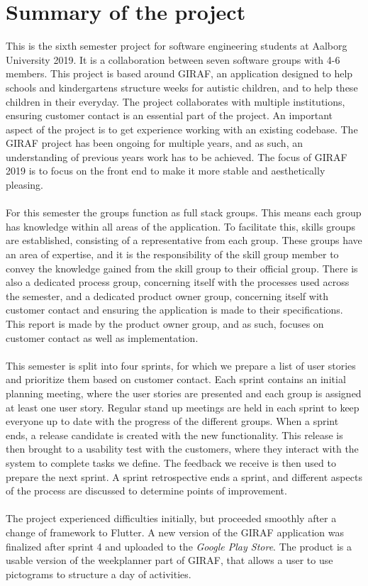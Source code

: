 \section{Summary of the project}\label{appendix:project-summary}
This is the sixth semester project for software engineering students at Aalborg University 2019.
It is a collaboration between seven software groups with 4-6 members.
This project is based around GIRAF, an application designed to help schools and kindergartens structure weeks for autistic children, and to help these children in their everyday.
The project collaborates with multiple institutions, ensuring customer contact is an essential part of the project.
An important aspect of the project is to get experience working with an existing codebase. 
The GIRAF project has been ongoing for multiple years, and as such, an understanding of previous years work has to be achieved.
The focus of GIRAF 2019 is to focus on the front end to make it more stable and aesthetically pleasing.
\\\\
For this semester the groups function as full stack groups.
This means each group has knowledge within all areas of the application.
To facilitate this, skills groups are established, consisting of a representative from each group.
These groups have an area of expertise, and it is the responsibility of the skill group member to convey the knowledge gained from the skill group to their official group.
There is also a dedicated process group, concerning itself with the processes used across the semester, and a dedicated product owner group, concerning itself with customer contact and ensuring the application is made to their specifications.
This report is made by the product owner group, and as such, focuses on customer contact as well as implementation.
\\\\
This semester is split into four sprints, for which we prepare a list of user stories and prioritize them based on customer contact.
Each sprint contains an initial planning meeting, where the user stories are presented and each group is assigned at least one user story.
Regular stand up meetings are held in each sprint to keep everyone up to date with the progress of the different groups.
When a sprint ends, a release candidate is created with the new functionality.
This release is then brought to a usability test with the customers, where they interact with the system to complete tasks we define.
The feedback we receive is then used to prepare the next sprint.
A sprint retrospective ends a sprint, and different aspects of the process are discussed to determine points of improvement.
\\\\
The project experienced difficulties initially, but proceeded smoothly after a change of framework to Flutter.
A new version of the GIRAF application was finalized after sprint 4 and uploaded to the \textit{Google Play Store}.
The product is a usable version of the weekplanner part of GIRAF, that allows a user to use pictograms to structure a day of activities.

